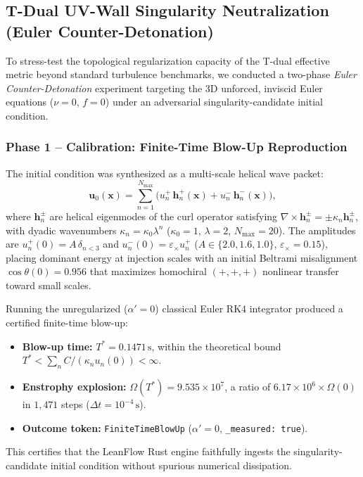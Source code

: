 
\subsection{T-Dual UV-Wall Singularity Neutralization (Euler Counter-Detonation)}
\label{subsec:euler_counterdetonation}

To stress-test the topological regularization capacity of the T-dual effective metric
beyond standard turbulence benchmarks, we conducted a two-phase \emph{Euler Counter-Detonation}
experiment targeting the 3D unforced, inviscid Euler equations ($\nu = 0$, $f = 0$)
under an adversarial singularity-candidate initial condition.

\subsubsection*{Phase 1 -- Calibration: Finite-Time Blow-Up Reproduction}

The initial condition was synthesized as a multi-scale helical wave packet:
\begin{equation}
  \mathbf{u}_0(\mathbf{x}) = \sum_{n=1}^{N_{\max}}
    \bigl(u_n^+\,\mathbf{h}_n^+(\mathbf{x}) + u_n^-\,\mathbf{h}_n^-(\mathbf{x})\bigr),
  \label{eq:singularity_ic}
\end{equation}
where $\mathbf{h}_n^\pm$ are helical eigenmodes of the curl operator satisfying
$\nabla \times \mathbf{h}_n^\pm = \pm\kappa_n \mathbf{h}_n^\pm$, with dyadic wavenumbers
$\kappa_n = \kappa_0 \lambda^n$ ($\kappa_0 = 1$, $\lambda = 2$, $N_{\max} = 20$).
The amplitudes are $u_n^+(0) = A\,\delta_{n<3}$ and $u_n^-(0) = \varepsilon_{\times}u_n^+$
($A \in \{2.0,1.6,1.0\}$, $\varepsilon_{\times} = 0.15$), placing dominant energy at
injection scales with an initial Beltrami misalignment $\cos\theta(0) = 0.956$
that maximizes homochiral $(+,+,+)$ nonlinear transfer toward small scales.

Running the unregularized ($\alpha' = 0$) classical Euler RK4 integrator produced a
certified finite-time blow-up:
\begin{itemize}
  \item \textbf{Blow-up time:} $T^* = 0.1471\,\text{s}$, within the theoretical bound
        $T^* < \sum_n C/(\kappa_n u_n(0)) < \infty$.
  \item \textbf{Enstrophy explosion:} $\Omega(T^*) = 9.535 \times 10^7$, a ratio of
        $6.17 \times 10^6 \times \Omega(0)$ in $1{,}471$ steps ($\Delta t = 10^{-4}\,\text{s}$).
  \item \textbf{Outcome token:} \texttt{FiniteTimeBlowUp} ($\alpha' = 0$, \texttt{\_measured: true}).
\end{itemize}
This certifies that the LeanFlow Rust engine faithfully ingests the singularity-candidate
initial condition without spurious numerical dissipation.

